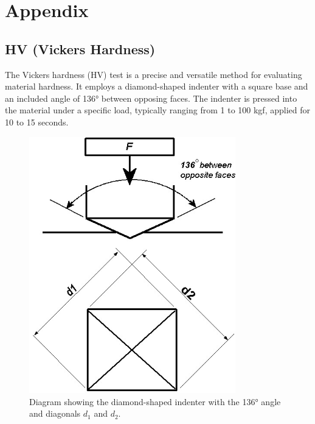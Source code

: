 \documentclass{article}
\begin{document}
   
    
\section{Appendix}
\normalsize
\renewcommand{\thesubsection}{\Alph{subsection}}
\subsection{HV (Vickers Hardness)}  
    The Vickers hardness (HV) test is a precise and versatile method for evaluating material hardness. It employs a diamond-shaped indenter with a square base and an included angle of 136° between opposing faces. 
    The indenter is pressed into the material under a specific load, typically ranging from 1 to 100 kgf, applied for 10 to 15 seconds.
    \begin{figure}[H]
        \centering
        \begin{minipage}{0.45\textwidth}\centering
            \vspace{1em}\includegraphics[width=0.8\textwidth]{figures/3537580_orig-0000.jpg}
            \caption{Diagram showing the diamond-shaped indenter with the 136° angle and diagonals \(d_1\) and \(d_2\).}
            \label{fig:vickers-diagram}
        \end{minipage}\hfill
        \begin{minipage}{0.51\textwidth}

\end{minipage}
\end{figure}
\end{document}
